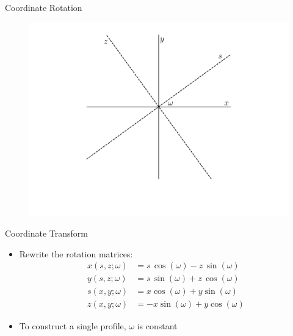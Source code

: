 \documentclass{beamer}
\begin{document}
\begin{frame}{Coordinate Rotation}
	\begin{figure}[H] 
		\centering %
		\includegraphics[width=0.8\linewidth]{figures/rotation1.pdf}
		\label{fig:xy_unit_circle_s_z}
	\end{figure}
\end{frame}

\begin{frame}{Coordinate Transform}
\begin{itemize}
    \item
        Rewrite the rotation matrices: %
    \begin{align*}
        x(s, z; \omega) & = s\, \cos (\omega) - z\,\sin (\omega) \\
        y(s, z; \omega) & = s\, \sin (\omega) + z\,\cos (\omega) \\
        s(x, y; \omega) & = x \cos (\omega) + y \sin (\omega) \\
        z(x, y; \omega) & = -x \sin (\omega) + y \cos (\omega)
    \end{align*}
    \item
        To construct a single profile, $\omega$ is constant
\end{itemize}
\end{frame}
\end{document}
